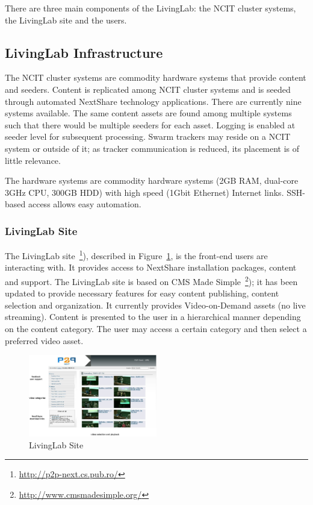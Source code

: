 There are three main components of the LivingLab: the NCIT cluster
systems, the LivingLab site and the users.

\subsection{LivingLab Infrastructure}
\label{subsec:multimedia-dist:evaluation-infrastructure}

The NCIT cluster systems are commodity hardware systems that provide content
and seeders. Content is replicated among NCIT cluster systems and is seeded
through automated NextShare technology applications. There are currently nine
systems available. The same content assets are found among multiple systems
such that there would be multiple seeders for each asset. Logging is enabled
at seeder level for subsequent processing. Swarm trackers may reside on a NCIT
system or outside of it; as tracker communication is reduced, its placement is
of little relevance.

The hardware systems are commodity hardware systems (2GB RAM, dual-core 3GHz
CPU, 300GB HDD) with high speed (1Gbit Ethernet) Internet links. SSH-based
access allows easy automation.

\subsubsection{LivingLab Site}

The LivingLab site~\footnote{\url{http://p2p-next.cs.pub.ro/}}), described in
Figure~\ref{fig:multimedia-dist:upb-living-lab-site}, is
the front-end users are interacting with. It provides access to NextShare
installation packages, content and support. The LivingLab site is based on
CMS Made Simple~\footnote{\url{http://www.cmsmadesimple.org/}}); it has been updated to
provide necessary features for easy content publishing, content selection and
organization. It currently provides Video-on-Demand assets (no live
streaming). Content is presented to the user in a hierarchical manner
depending on the content category. The user may access a certain
category and then select a preferred video asset.

\begin{figure}
  \centering
  \includegraphics[width=0.5\textwidth]{src/img/multimedia-dist/upb-living-lab-site}
  \caption{LivingLab Site}
  \label{fig:multimedia-dist:upb-living-lab-site}
\end{figure}

